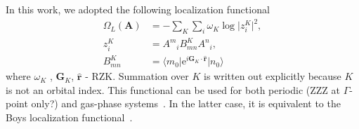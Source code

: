 \documentclass[aps,prl,reprint,amsmath,amssymb]{revtex4-1}
\newcommand*{\imi}{i} %
\newcommand*{\E}{\mathrm{e}}
\newcommand{\ket}[1]{\ensuremath{\vert #1 \rangle}}
\newcommand{\bra}[1]{\ensuremath{\langle #1 \vert}}
\newcommand{\op}[1]{\ensuremath{\hat{#1}}} %
\begin{document}
In this work, we adopted the following localization functional 
%
\begin{equation} \label{eq:fun-loc}
\begin{split}
\Omega_L(\mathbf{A}) &= - \sum_K \sum_i \omega_K \log \vert z_{i}^{K} \vert^2, \\
z_{i}^{K} &= {A^m}_i B^{K}_{mn} {A^n}_i, \\
B^{K}_{mn} &= \bra{m_0} \E^{\imi \mathbf{G}_K \cdot \mathbf{\op{r}}} \ket{n_0}
\end{split}
\end{equation}
%
where $\omega_K$ , $\mathbf{G}_K$, $\mathbf{\op{r}}$ - RZK. Summation over $K$ is written out explicitly because $K$ is not an orbital index. This functional can be used for both periodic (ZZZ at $\Gamma$-point only?) and gas-phase systems~\cite{berghold2000general}. In the latter case, it is equivalent to the Boys localization functional~\cite{RZK}.
\end{document}
